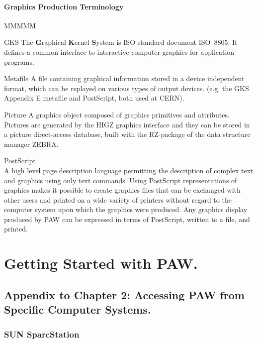 \subsubsection*{Graphics Production Terminology}

\begin{DL}{MMMMM}
\item[GKS]       The {\bf G}raphical {\bf K}ernel {\bf S}ystem is
                 ISO standard document ISO~8805. It defines a common
                 interface to interactive computer graphics 
                 for application programs.
\item[Metafile]  A file containing graphical information
                 stored in a device independent format,
                 which can be replayed on various types of output devices.
                 (e.g. the GKS Appendix E metafile and PostScript, 
                 both used at CERN).
\item[Picture]   A graphics object composed of graphics primitives 
                 and attributes.
                 Pictures are generated by
                 the HIGZ graphics interface and they can be stored in a picture
                 direct-access database, built with the RZ-package of the
                 data structure manager ZEBRA.
\item[PostScript]\mbox{}\\
     A high level page description language permitting the description of complex
     text and graphics using only text commands.  Using PostScript
     representations of graphics makes it possible to create graphics
     files that can be exchanged with other users and printed on
     a wide variety of printers without regard to the computer system
     upon which the graphics were produced.  Any graphics display
     produced by PAW can be expressed in terms of PostScript, written
     to a file, and printed.
\end{DL}
 
\chapter{Getting Started with PAW.}
\section*{Appendix to Chapter 2: Accessing PAW from
Specific Computer Systems.}
 
\subsection{SUN SparcStation}
 
